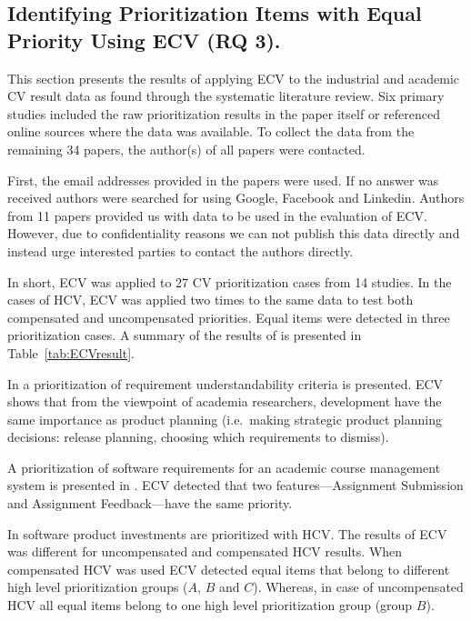 \subsection{Identifying Prioritization Items with Equal Priority Using ECV (RQ 3).\label{rq3}}

This section presents the results of applying ECV to the industrial and academic CV result data as found through the systematic literature review. Six primary studies included the raw prioritization results in the paper itself or referenced online sources where the data was available. To collect the data from the remaining 34 papers, the author(s) of all papers were contacted.

First, the email addresses provided in the papers were used. If no answer was received authors were searched for using Google, Facebook and Linkedin. Authors from 11 papers provided us with data to be used in the evaluation of ECV. However, due to confidentiality reasons we can not publish this data directly and instead urge interested parties to contact the authors directly.

In short, ECV was applied to 27 CV prioritization cases from 14 studies.
In the cases of HCV, ECV was applied two times to the same data to test both compensated and uncompensated priorities. Equal items were detected in three prioritization cases. A summary of the results of is presented in Table~\ref{tab:ECVresult}.

In \citep{Svahnberg2008} a prioritization of requirement understandability
criteria is presented. ECV shows that from the viewpoint of academia
researchers, development have the same importance as
product planning (i.e.\ making strategic product planning decisions: release
planning, choosing which requirements to dismiss).

A prioritization of software requirements for an academic course management system is presented in \citep{Berander2009a}. ECV detected that two features---Assignment Submission and Assignment Feedback---have the same priority.

In \citep{Barney2009} software product investments are prioritized with HCV.
The results of ECV was different for uncompensated and compensated HCV results.
When compensated HCV was used ECV detected equal items that belong to different high level prioritization groups ($A$, $B$ and $C$).
Whereas, in case of uncompensated HCV all equal items belong to one high level prioritization group (group $B$).